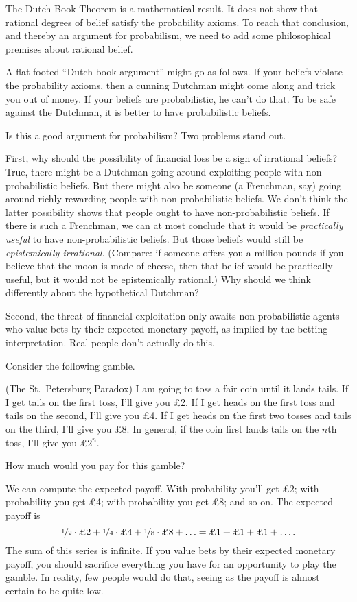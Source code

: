 The Dutch Book Theorem is a mathematical result. It does not show that rational
degrees of belief satisfy the probability axioms. To reach that conclusion, and
thereby an argument for probabilism, we need to add some philosophical premises
about rational belief.

A flat-footed ``Dutch book argument'' might go as follows.
If your beliefs violate the probability axioms,
then a cunning Dutchman might come along and trick you out of money.
If your beliefs are probabilistic,
he can't do that.
To be safe against the Dutchman,
it is better to have probabilistic beliefs.

Is this a good argument for probabilism? Two problems stand out.

First, why should the possibility of financial loss be a sign of irrational
beliefs? True, there might be a Dutchman going around exploiting people with
non-proba\-bi\-lis\-tic beliefs. But there might also be someone (a Frenchman,
say) going around richly rewarding people with non-probabilistic beliefs. We
don't think the latter possibility shows that people ought to have
non-probabilistic beliefs. If there is such a Frenchman, we can at most conclude
that it would be \emph{practically useful} to have non-probabilistic beliefs.
But those beliefs would still be \emph{epistemically irrational}. (Compare: if
someone offers you a million pounds if you believe that the moon is made of
cheese, then that belief would be practically useful, but it would not be
epistemically rational.) Why should we think differently about the hypothetical
Dutchman?

Second, the threat of financial exploitation only awaits non-probabilistic
agents who value bets by their expected monetary payoff, as implied by the
betting interpretation. Real people don't actually do this.

Consider the following gamble.
\begin{example}(The St.\ Petersburg Paradox)
  I am going to toss a fair coin until it lands tails. If I get tails on the
  first toss, I'll give you £2. If I get heads on the first toss and tails on
  the second, I'll give you £4. If I get heads on the first two tosses and tails
  on the third, I'll give you £8. In general, if the coin first lands tails on
  the $n$th toss, I'll give you £$2^n$.
\end{example}
How much would you pay for this gamble? 

We can compute the expected payoff. With probability 
you'll get £2; with probability  you get £4; with
probability  you get £8; and so on. The expected payoff
is
\[
  \nicefrac{1}{2} \cdot \text{£2} + 
  \nicefrac{1}{4} \cdot \text{£4} + 
  \nicefrac{1}{8} \cdot \text{£8} + 
  \ldots = \text{£1} +  \text{£1} +  \text{£1} + \ldots. 
\]
The sum of this series is infinite. If you value bets by their expected monetary
payoff, you should sacrifice everything you have for an opportunity to play the
gamble. In reality, few people would do that, seeing as the payoff is almost
certain to be quite low.

